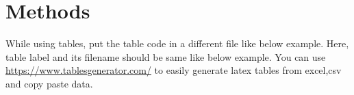 \section{Methods}
\label{section-methods}

\lipsum[10]


While using tables, put the table code in a different file like below example.
Here, table label and its filename should be same like below example.
You can use \url{https://www.tablesgenerator.com/} to easily generate latex tables from excel,csv and copy paste data.





